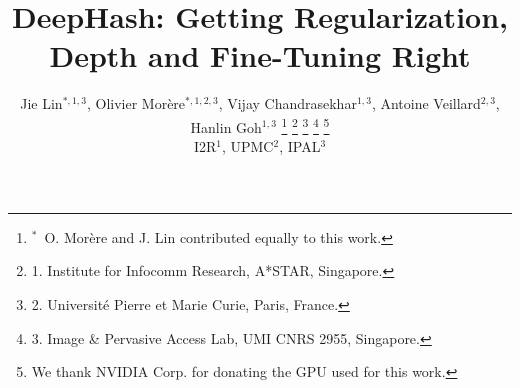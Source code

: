 \documentclass[10pt,twocolumn,letterpaper]{article}
\begin{document}
\title{DeepHash: Getting Regularization, Depth and Fine-Tuning Right}


\renewcommand\footnotemark{}
\renewcommand\footnoterule{}

\author{
Jie Lin{$^{*,1,3}$},
Olivier Mor\`ere{$^{*,1,2,3}$}, 
Vijay Chandrasekhar{$^{1,3}$}, 
Antoine Veillard{$^{2,3}$}, 
Hanlin Goh{$^{1,3}$}%
\thanks{{$^{*}$}\, O. Mor\`ere and J. Lin contributed equally to this work.}
\thanks{1. Institute for Infocomm Research, A*STAR, Singapore.}
\thanks{2. Universit\'e Pierre et Marie Curie, Paris, France.}
\thanks{3. Image \& Pervasive Access Lab, UMI CNRS 2955, Singapore.} 
\thanks{We thank NVIDIA Corp. for donating the GPU used for this work.}\\
{I2R{$^{1}$}, UPMC{$^{2}$}, IPAL{$^{3}$}}}

 
\maketitle


%
%
\end{document}
